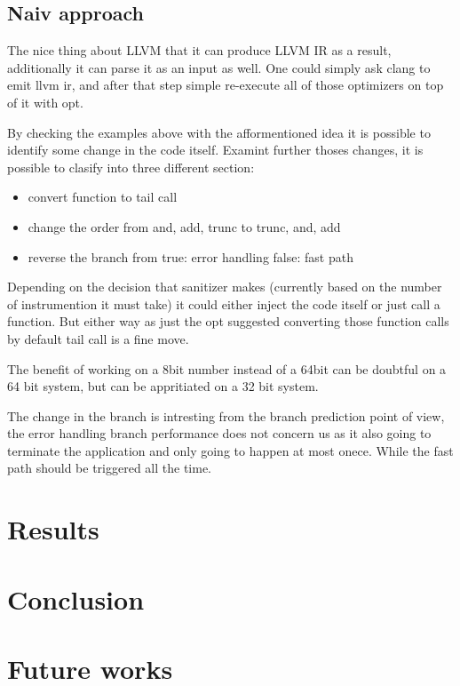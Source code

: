 \documentclass[letterpaper, 10 pt]{llncs}
\begin{document}
\subsection{Naiv approach}

The nice thing about LLVM that it can produce LLVM IR as a result, additionally it can parse it as an input as well. One could simply ask clang to emit llvm ir, and after that step simple re-execute all of those optimizers on top of it with opt.

By checking the examples above with the afformentioned idea it is possible to identify some change in the code itself. Examint further thoses changes, it is possible to clasify into three different section:
\begin{itemize}
 \item convert function to tail call
 \item change the order from and, add, trunc to trunc, and, add
 \item reverse the branch from true: error handling false: fast path
\end{itemize}

Depending on the decision that sanitizer makes (currently based on the number of instrumention it must take) it could either inject the code itself or just call a function. But either way as just the opt suggested converting those function calls by default tail call is a fine move.

The benefit of working on a 8bit number instead of a 64bit can be doubtful on a 64 bit system, but can be appritiated on a 32 bit system.

The change in the branch is intresting from the branch prediction point of view, the error handling branch performance does not concern us as it also going to terminate the application and only going to happen at most onece. While the fast path should be triggered all the time.

\section{Results}
\section{Conclusion}
\section{Future works}
\end{document}
